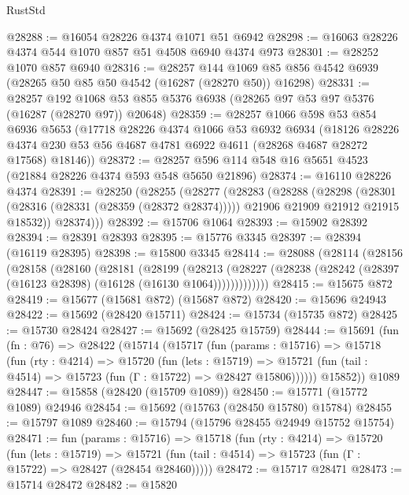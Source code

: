 \begin{lexlean}{RustStd}
\begin{coremodule}
@28288 := @16054 @28226 @4374 @1071 @51 @6942
@28298 := @16063 @28226 @4374 @544 @1070 @857 @51 @4508 @6940 @4374 @973
@28301 := @28252 @1070 @857 @6940
@28316 := @28257
    @144
    @1069
    @85
    @856
    @4542
    @6939
    (@28265 @50 @85 @50 @4542 (@16287 (@28270 @50)) @16298)
@28331 := @28257
    @192
    @1068
    @53
    @855
    @5376
    @6938
    (@28265 @97 @53 @97 @5376 (@16287 (@28270 @97)) @20648)
@28359 := @28257
    @1066
    @598
    @53
    @854
    @6936
    @5653
    (@17718
      @28226
      @4374
      @1066
      @53
      @6932
      @6934
      (@18126
        @28226
        @4374
        @230
        @53
        @56
        @4687
        @4781
        @6922
        @4611
        (@28268 @4687 @28272 @17568)
        @18146))
@28372 := @28257 @596 @114 @548 @16 @5651 @4523 (@21884 @28226 @4374 @593 @548 @5650 @21896)
@28374 := @16110 @28226 @4374
@28391 := @28250
    (@28255
      (@28277
        (@28283
          (@28288
            (@28298
              (@28301 (@28316 (@28331 (@28359 (@28372 @28374)))))
              @21906
              @21909
              @21912
              @21915
              @18532))
          @28374)))
@28392 := @15706 @1064
@28393 := @15902 @28392
@28394 := @28391 @28393
@28395 := @15776 @3345
@28397 := @28394 (@16119 @28395)
@28398 := @15800 @3345
@28414 := @28088
    (@28114
      (@28156
        (@28158
          (@28160
            (@28181
              (@28199
                (@28213
                  (@28227 (@28238 (@28242 (@28397 (@16123 @28398) (@16128 (@16130 @1064)))))))))))))
@28415 := @15675 @872
@28419 := @15677 (@15681 @872) (@15687 @872)
@28420 := @15696 @24943
@28422 := @15692 (@28420 @15711)
@28424 := @15734 (@15735 @872)
@28425 := @15730 @28424
@28427 := @15692 (@28425 @15759)
@28444 := @15691
    (fun (fn : @76) =>
    @28422
      (@15714
        (@15717
          (fun (params : @15716) =>
          @15718
            (fun (rty : @4214) =>
            @15720
              (fun (lets : @15719) =>
              @15721 (fun (tail : @4514) => @15723 (fun (Γ : @15722) => @28427 @15806))))))
        @15852))
    @1089
@28447 := @15858 (@28420 (@15709 @1089))
@28450 := @15771 (@15772 @1089) @24946
@28454 := @15692 (@15763 (@28450 @15780) @15784)
@28455 := @15797 @1089
@28460 := @15794 (@15796 @28455 @24949 @15752 @15754)
@28471 := fun (params : @15716) =>
  @15718
    (fun (rty : @4214) =>
    @15720
      (fun (lets : @15719) =>
      @15721 (fun (tail : @4514) => @15723 (fun (Γ : @15722) => @28427 (@28454 @28460)))))
@28472 := @15717 @28471
@28473 := @15714 @28472
@28482 := @15820

\end{coremodule}
\end{lexlean}
